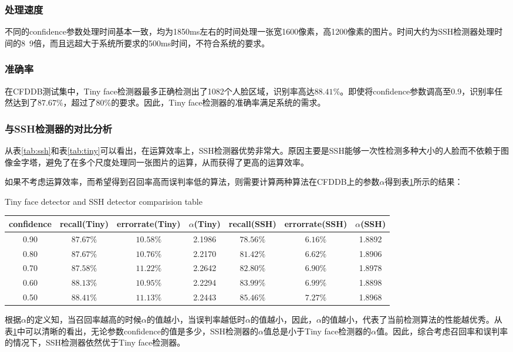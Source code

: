 \subsubsection{处理速度}

不同的confidence参数处理时间基本一致，均为1850ms左右的时间处理一张宽1600像素，高1200像素的图片。时间大约为SSH检测器处理时间的8~9倍，而且远超大于系统所要求的500ms时间，不符合系统的要求。

\subsubsection{准确率}

在CFDDB测试集中，Tiny face检测器最多正确检测出了1082个人脸区域，识别率高达$88.41\%$。即使将confidence参数调高至0.9，识别率任然达到了$87.67\%$，超过了$80\%$的要求。因此，Tiny face检测器的准确率满足系统的需求。

\subsubsection{与SSH检测器的对比分析}

从表\ref{tab:ssh}和表\ref{tab:tiny}可以看出，在运算效率上，SSH检测器优势非常大。原因主要是SSH能够一次性检测多种大小的人脸而不依赖于图像金字塔，避免了在多个尺度处理同一张图片的运算，从而获得了更高的运算效率。

如果不考虑运算效率，而希望得到召回率高而误判率低的算法，则需要计算两种算法在CFDDB上的参数$\alpha$得到表\ref{tab:tinyandssh}所示的结果：

\begin{table}[!hpb]
	\centering
	{Tiny face detector and SSH detector comparision table}
	\label{tab:tinyandssh}
	\begin{tabular}{ c|ccc|ccc }
		\hline
		confidence & recall(Tiny) & errorrate(Tiny) &$\alpha$(Tiny) & recall(SSH)& errorrate(SSH)& $\alpha$(SSH)\\
		\hline
		0.90  & $87.67\%$& $10.58\%$& 2.1986 & $78.56\%$& $6.16\%$& 1.8892\\
		0.80  & $87.67\%$& $10.76\%$& 2.2170 & $81.42\%$& $6.62\%$& 1.8906\\
		0.70  & $87.58\%$& $11.22\%$& 2.2642 & $82.80\%$& $6.90\%$& 1.8978\\
		0.60  & $88.13\%$& $10.95\%$& 2.2294 & $83.99\%$& $6.99\%$& 1.8898\\
		0.50  & $88.41\%$& $11.13\%$& 2.2443 & $85.46\%$& $7.27\%$& 1.8968\\
		\hline
	\end{tabular}
\end{table}

根据$\alpha$的定义知，当召回率越高的时候$\alpha$的值越小，当误判率越低时$\alpha$的值越小，因此，$\alpha$的值越小，代表了当前检测算法的性能越优秀。从表\ref{tab:tinyandssh}中可以清晰的看出，无论参数confidence的值是多少，SSH检测器的$\alpha$值总是小于Tiny face检测器的$\alpha$值。因此，综合考虑召回率和误判率的情况下，SSH检测器依然优于Tiny face检测器。




